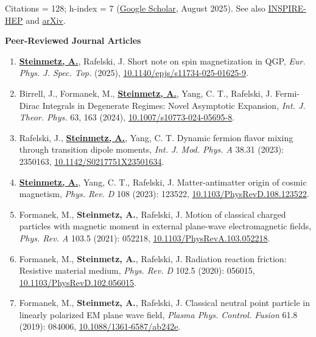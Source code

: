 \documentclass[11pt]{article}
\begin{document}
Citations = 128; h-index = 7 (\href{https://scholar.google.com/citations?user=fJBK1GIAAAAJ}{Google Scholar}, August 2025). See also \href{https://inspirehep.net/authors/1796313}{INSPIRE-HEP} and \href{https://arxiv.org/a/steinmetz_a_1.html}{arXiv}.

{\large\textbf{Peer-Reviewed Journal Articles}}

\begin{enumerate}[leftmargin=*,nosep]
    \item \textbf{\href{https://github.com/ajsteinmetz/short-note-qgp}{Steinmetz, A.}}, Rafelski, J. Short note on spin magnetization in QGP, \textit{Eur. Phys. J. Spec. Top.} (2025), \href{https://doi.org/10.1140/epjs/s11734-025-01625-9}{10.1140/epjs/s11734-025-01625-9}.
    \item Birrell, J., Formanek, M., \textbf{\href{https://github.com/ajsteinmetz/fermi-distribution}{Steinmetz, A.}}, Yang, C. T., Rafelski, J. Fermi-Dirac Integrals in Degenerate Regimes: Novel Asymptotic Expansion, \textit{Int. J. Theor. Phys.} 63, 163 (2024), \href{https://doi.org/10.1007/s10773-024-05695-8}{10.1007/s10773-024-05695-8}.
    \item Rafelski, J., \textbf{\href{https://github.com/ajsteinmetz/neutrino-transition-moments}{Steinmetz, A.}}, Yang, C. T. Dynamic fermion flavor mixing through transition dipole moments, \textit{Int. J. Mod. Phys. A} 38.31 (2023): 2350163, \href{https://doi.org/10.1142/S0217751X23501634}{10.1142/S0217751X23501634}.
    \item \textbf{\href{https://github.com/ajsteinmetz/plasma-partition}{Steinmetz, A.}}, Yang, C. T., Rafelski, J. Matter-antimatter origin of cosmic magnetism, \textit{Phys. Rev. D} 108 (2023): 123522, \href{https://doi.org/10.1103/PhysRevD.108.123522}{10.1103/PhysRevD.108.123522}.
    \item Formanek, M., \textbf{Steinmetz, A.}, Rafelski, J. Motion of classical charged particles with magnetic moment in external plane-wave electromagnetic fields, \textit{Phys. Rev. A} 103.5 (2021): 052218, \href{https://doi.org/10.1103/PhysRevA.103.052218}{10.1103/PhysRevA.103.052218}.
    \item Formanek, M., \textbf{Steinmetz, A.}, Rafelski, J. Radiation reaction friction: Resistive material medium, \textit{Phys. Rev. D} 102.5 (2020): 056015, \href{https://doi.org/10.1103/PhysRevD.102.056015}{10.1103/PhysRevD.102.056015}.
    \item Formanek, M., \textbf{Steinmetz, A.}, Rafelski, J. Classical neutral point particle in linearly polarized EM plane wave field, \textit{Plasma Phys. Control. Fusion} 61.8 (2019): 084006, \href{https://doi.org/10.1088/1361-6587/ab242e}{10.1088/1361-6587/ab242e}.

\end{enumerate}
\end{document}
